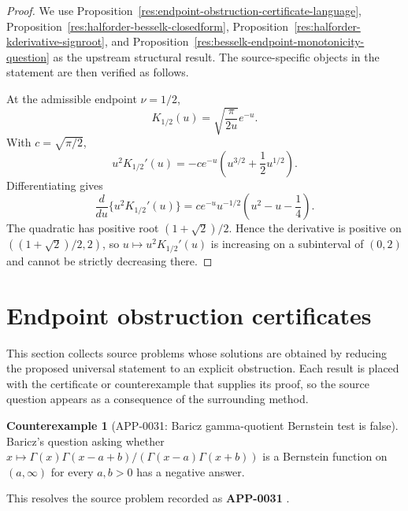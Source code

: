 \documentclass[11pt]{article}
\numberwithin{equation}{section}
\theoremstyle{definition}
\newtheorem{counterexample}[theorem]{Counterexample}
\theoremstyle{remark}
\newcommand{\1}{\mathbf 1}
\begin{document}
\begin{proof}
We use Proposition~\ref{res:endpoint-obstruction-certificate-language}, Proposition~\ref{res:halforder-besselk-closedform}, Proposition~\ref{res:halforder-kderivative-signroot}, and Proposition~\ref{res:besselk-endpoint-monotonicity-question} as the upstream structural result. The source-specific objects in the statement are then verified as follows.

At the admissible endpoint \(\nu=1/2\),
\[
K_{1/2}(u)=\sqrt{\frac{\pi}{2u}}e^{-u}.
\]
With \(c=\sqrt{\pi/2}\),
\[
u^2K_{1/2}'(u)=-c e^{-u}\left(u^{3/2}+\frac12u^{1/2}\right).
\]
Differentiating gives
\[
\frac{d}{du}\{u^2K_{1/2}'(u)\}
=ce^{-u}u^{-1/2}\left(u^2-u-\frac14\right).
\]
The quadratic has positive root \((1+\sqrt2)/2\). Hence the derivative is positive on \(((1+\sqrt2)/2,2)\), so \(u\mapsto u^2K_{1/2}'(u)\) is increasing on a subinterval of \((0,2)\) and cannot be strictly decreasing there.
\end{proof}

\section{Endpoint obstruction certificates}
\label{sec:endpoint-obstruction-certificates-main}



This section collects source problems whose solutions are obtained by reducing the proposed universal statement to an explicit obstruction.  Each result is placed with the certificate or counterexample that supplies its proof, so the source question appears as a consequence of the surrounding method.

\begin{counterexample}[APP-0031: Baricz gamma-quotient Bernstein test is false]
\label{res:baricz-gamma-quotient-bf-forall-negative-answer}
Baricz's question asking whether \(x\mapsto\Gamma(x)\Gamma(x-a+b)/(\Gamma(x-a)\Gamma(x+b))\) is a Bernstein function on \((a,\infty)\) for every \(a,b>0\) has a negative answer.



This resolves the source problem recorded as \textbf{APP-0031} \cite{baricz-turan}.
\end{counterexample}
\end{document}
